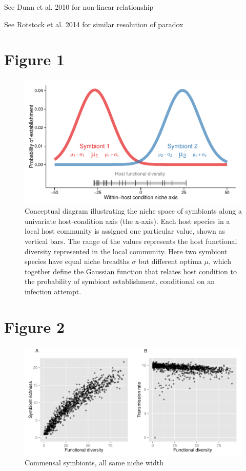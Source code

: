 \documentclass[12pt]{article}
\begin{document}
See Dunn et al. 2010 for non-linear relationship

See Rotstock et al. 2014 for similar resolution of paradox




\newpage

\section*{Figure 1}

\begin{figure}[ht]\centering
\includegraphics[width=\linewidth]{fig/niche.pdf}
\caption{Conceptual diagram illustrating the niche space of symbionts along a univariate host-condition axis (the x-axis). Each host species in a local host community is assigned one particular value, shown as vertical bars. The range of the values represents the host functional diversity represented in the local community. Here two symbiont species have equal niche breadths $\sigma$ but different optima $\mu$, which together define the Gaussian function that relates host condition to the probability of symbiont establishment, conditional on an infection attempt.}
\label{fig:niche}
\end{figure}

\newpage

\section*{Figure 2}

\begin{figure}[ht]\centering
\includegraphics[width=\linewidth]{fig/fig1.pdf}
\caption{Commensal symbionts, all same niche width}
\label{f2}
\end{figure}
\end{document}
